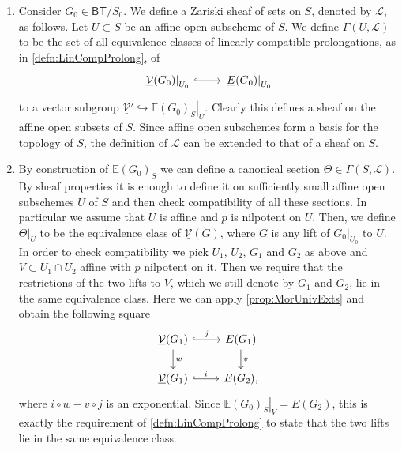 \begin{rem}[]\leavevmode\vspace{-.2\baselineskip}
\begin{enumerate}
	\item Consider $G_0 \in \mathsf{BT}/S_0$.
		We define a Zariski sheaf of sets on $S$, denoted by $\mathscr{L}$,
		as follows.
		Let $U \subset S$ be an affine open subscheme of $S$.
		We define $\Gamma(U,\mathscr{L})$ to be the set of all 
		equivalence classes of linearly compatible prolongations,
		as in \cref{defn:LinCompProlong}, of
		\begin{equation*}
		\begin{tikzcd}[row sep = 0ex
			,/tikz/column 1/.append style={anchor=base east}
			,/tikz/column 2/.append style={anchor=base west}]
			\left.\underline{\mathcal{V}}(G_0)\right|_{U_0} \arrow[r, "", hookrightarrow] &
			\left.\underline{E}(G_0)\right|_{U_0}
		\end{tikzcd}
		\end{equation*} 
		to a vector subgroup $\underline{\mathcal{V}}' \hookrightarrow 
		\left.\mathbb{E}(G_0)_S\right|_{U}$.
		Clearly this defines a sheaf on the affine open subsets of $S$.
		Since affine open subschemes form a basis for the topology of $S$, the definition
		of $\mathscr{L}$ can be extended to that of a sheaf on $S$.

	\item By construction of $\mathbb{E}(G_0)_S$ we can define a canonical
		section $\Theta \in \Gamma(S, \mathscr{L})$.
		By sheaf properties it is enough to define it on sufficiently small
		affine open subschemes $U$ of $S$ and then check compatibility of all
		these sections.
		In particular we assume that $U$ is affine and $p$ is nilpotent on $U$.
		Then, we define $\left.\Theta\right|_{ U }$ to be the equivalence class
		of $\underline{\mathcal{V}}(G)$, where $G$ is any lift of $\left.G_0\right|_{ U_0 }$
		to $U$.
		In order to check compatibility we pick $U_1$, $U_2$, $G_1$ and $G_2$
		as above and $V \subset U_1 \cap U_2$ affine
		with $p$ nilpotent on it.
		Then we require that the restrictions of the two lifts to $V$,
		which we still denote by $G_1$ and $G_2$, lie in the same equivalence class.
		Here we can apply \cref{prop:MorUnivExts} and obtain the following
		square
		\begin{equation*}
		\begin{tikzcd}
			\underline{\mathcal{V}}(G_1) \arrow[r, "j", hookrightarrow] 
			\arrow[d, "w", rightarrow] &
			E(G_1) \arrow[d, "v", rightarrow] \\
			\underline{\mathcal{V}}(G_1) \arrow[r, "i", hookrightarrow] &
			E(G_2)
		,\end{tikzcd}
		\end{equation*}
		where $i \circ w - v \circ j$ is an exponential.
		Since $\left.\mathbb{E}(G_0)_S\right|_{ V } = E(G_2)$,
		this is exactly the requirement of \cref{defn:LinCompProlong} 
		to state that the two lifts lie in the same equivalence class.


\end{enumerate}
\end{rem}

